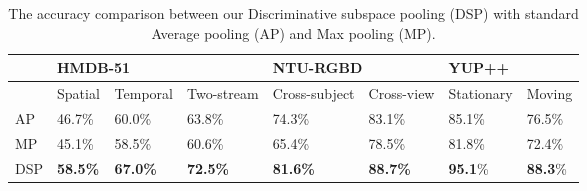 \documentclass[runningheads]{llncs}
\newcommand{\comment}[1]{}
\begin{document}
\begin{table}[t]
\centering
\begin{tabular}{|l|l|l|l|l|l|l|l|}
\hline
    & \multicolumn{3}{l|}{HMDB-51}    & \multicolumn{2}{l|}{NTU-RGBD} & \multicolumn{2}{l|}{YUP++} \\ \hline
    & Spatial & Temporal & Two-stream & Cross-subject   & Cross-view  & Stationary     & Moving    \\ \hline
AP  & 46.7\%~\cite{feichtenhofer2016convolutional}  & 60.0\%~\cite{feichtenhofer2016convolutional}   & 63.8\%~\cite{feichtenhofer2016convolutional}     & 74.3\%~\cite{soo2017interpretable}          & 83.1\%~\cite{soo2017interpretable}      & 85.1\%         & 76.5\%    \\ \hline
MP  & 45.1\%  & 58.5\%   & 60.6\%     & 65.4\%          & 78.5\%      & 81.8\%         & 72.4\%    \\ \hline
DSP & \textbf{58.5\%}  & \textbf{67.0\%}   & \textbf{72.5\%}     & \textbf{81.6\%}          & \textbf{88.7\%}      & \textbf{95.1}\%         & \textbf{88.3}\%    \\ \hline
\end{tabular}
\caption{The accuracy comparison between our Discriminative subspace pooling (DSP) with standard Average pooling (AP) and Max pooling (MP).}
\label{table:1}
\end{table}
\comment{
\subsection{Parameter analysis}
In the Figure~\ref{subfig:2}, we present how the accuracy changes with and without embedding temporal order in different number of hyperplanes. As is clear, embedding temporal constraint will help the discriminative subspace to get a better representation. In terms of the number of hyperplanes, the accuracy increases about  from 1 hyperplane to 6 hyperplanes, and drops around  from 6 hyperplanes to 15 hyperplanes, which means a number of hyperplanes (6 in this case) is enough for capturing the discriminative feature of the sequence, redundant ones would catch the repeated information and cause confusion for the classifier. Additionally, in Figure~\ref{subfig:3}, we compare the accuracy with adversarial noise in different fooling rate. The higher the fooling rate is, the more adversarial noise will capture the information of the feature in different classes, which result in a better performance. Interestingly, our algorithm could performance relatively well without requiring a very high value of fooling rate of the adversarial noise From ~\cite{moosavi2017universal}, a lower fooling rate would reduce the amount of data that is used for generating the adversarial noise, which make the entire algorithm more computationally cheap.
}
\end{document}

